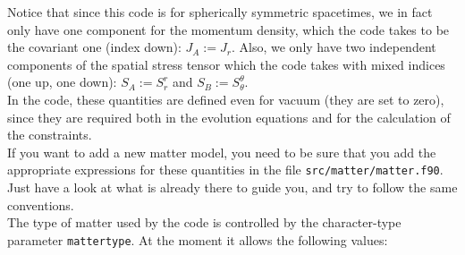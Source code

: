\documentclass[12pt]{article}
\begin{document}
Notice that since this code is for spherically symmetric spacetimes,
we in fact only have one component for the momentum density, which the
code takes to be the covariant one (index down): $J_A:=J_r$. Also, we
only have two independent components of the spatial stress tensor
which the code takes with mixed indices (one up, one down): $S_A :=
S^r_r$ and $S_B := S^\theta_\theta$. \\

In the code, these quantities are defined even for vacuum (they are
set to zero), since they are required both in the evolution equations
and for the calculation of the constraints. \\

If you want to add a new matter model, you need to be sure that you
add the appropriate expressions for these quantities in the file
\texttt{src/matter/matter.f90}.  Just have a look at what is already
there to guide you, and try to follow the same conventions. \\

The type of matter used by the code is controlled by the
character-type parameter \texttt{mattertype}.  At the moment it allows
the following values:
\end{document}
